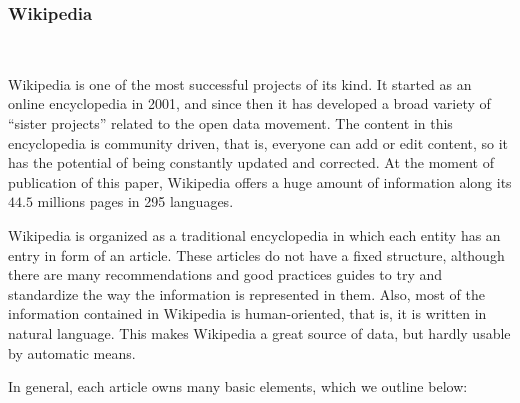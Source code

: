 \subsubsection{Wikipedia}~

Wikipedia is one of the most successful projects of its kind. It started as an online encyclopedia in 2001, and since then it has developed a broad variety of ``sister projects'' related to the open data movement. The content in this encyclopedia is community driven, that is, everyone can add or edit content, so it has the potential of being constantly updated and corrected. At the moment of publication of this paper, Wikipedia offers a huge amount of information along its $44.5$ millions pages in 295 languages.

Wikipedia is organized as a traditional encyclopedia in which each entity has an entry in form of an article. These articles do not have a fixed structure, although there are many recommendations and good practices guides to try and standardize the way the information is represented in them. Also, most of the information contained in Wikipedia is human-oriented, that is, it is written in natural language. This makes Wikipedia a great source of data, but hardly usable by automatic means.

In general, each article owns many basic elements, which we outline below:

